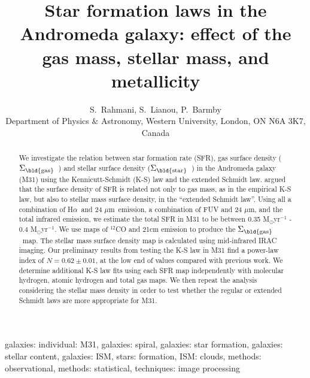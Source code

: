 \documentclass[useAMS,usenatbib]{mn2e}
\newcommand \sigmagas    {$\Sigma_{\rm \bld {gas }} $\ }
\newcommand \sigmastar    {$\Sigma_{\rm \bld {star }} $\ }
\newcommand \halpha    {H$\alpha $\ }
\newcommand \um    {$\mu$m\ }
\begin{document}
\title[STAR FORMATION LAWs IN M31]{Star formation laws in the Andromeda galaxy: effect of the gas mass, stellar mass, and metallicity }
\author[S. Rahmani, et. al.]{S.~Rahmani, S.~Lianou, P.~Barmby\\
Department of Physics $\&$ Astronomy, Western University, London, ON N6A 3K7, Canada}
\maketitle

\begin{abstract} %
 We investigate the relation between star formation rate (SFR), gas surface density (\sigmagas) and stellar surface density (\sigmastar) in the Andromeda galaxy (M31) using the Kennicutt-Schmidt (K-S) law and the extended Schmidt law. \cite{Shi11} argued that the surface density of SFR is related not only to gas mass, as in the empirical K-S law,  but also to stellar mass surface density, in the ``extended Schmidt law''. Using all a combination of \halpha and 24 \um emission, a combination of FUV and 24 $\mu$m, and the total infrared emission, we estimate the total SFR in M31 to be between 0.35 M$_{\odot}$yr$^{-1}$ - 0.4 M$_{\odot}$yr$^{-1}$. We use maps of $^{12}$CO and 21cm emission to produce the \sigmagas map.%
 The stellar mass surface density  map is calculated using mid-infrared IRAC imaging. Our preliminary results from testing the K-S law in M31 find a power-law index of  $N = 0.62 \pm 0.01$, at the low end of values compared with previous work. We determine additional K-S law fits using each SFR map independently with molecular hydrogen, atomic hydrogen and total gas maps. We then repeat the analysis considering the stellar mass density in order to test whether the regular or extended Schmidt laws are more appropriate for M31.

\end{abstract}

\begin{keywords} 
galaxies: individual: M31, galaxies: spiral, galaxies: star formation, galaxies: stellar content, galaxies: ISM, stars: formation, ISM: clouds, methods: observational, methods: statistical, techniques: image processing 
\end{keywords}
\end{document}
